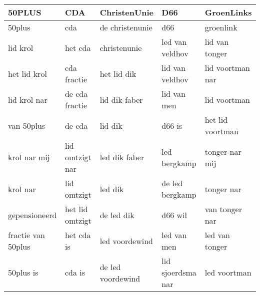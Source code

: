 \begin{tabular}{lllll}
\toprule
             50PLUS &              CDA &       ChristenUnie &                D66 &        GroenLinks \\
\midrule
             50plus &              cda &    de christenunie &                d66 &         groenlink \\
           lid krol &          het cda &       christenunie &    led van veldhov &    lid van tonger \\
       het lid krol &      cda fractie &        het lid dik &    lid van veldhov &  lid voortman nar \\
       lid krol nar &   de cda fractie &      lid dik faber &        lid van men &      lid voortman \\
         van 50plus &           de cda &            lid dik &             d66 is &  het lid voortman \\
       krol nar mij &  lid omtzigt nar &      led dik faber &       led bergkamp &    tonger nar mij \\
           krol nar &      lid omtzigt &            led dik &    de led bergkamp &        tonger nar \\
      gepensioneerd &  het lid omtzigt &         de led dik &            d66 wil &    van tonger nar \\
 fractie van 50plus &       het cda is &     led voordewind &        led van men &    led van tonger \\
          50plus is &           cda is &  de led voordewind &  lid sjoerdsma nar &      led voortman \\
\bottomrule
\end{tabular}
